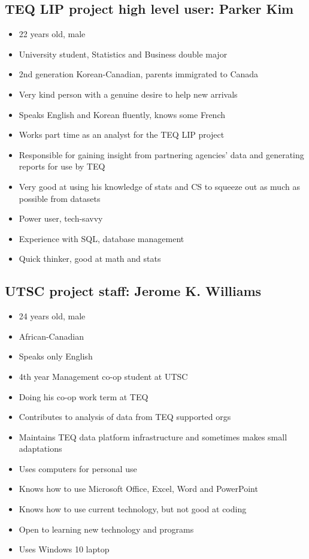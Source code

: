 \documentclass[]{scrreprt}
\begin{document}
\subsection{TEQ LIP project high level user: Parker Kim}
\begin{itemize}
	\item 22 years old, male
	\item University student, Statistics and Business double major
	\item 2nd generation Korean-Canadian, parents immigrated to Canada
	\item Very kind person with a genuine desire to help new arrivals
	\item Speaks English and Korean fluently, knows some French
	\item Works part time as an analyst for the TEQ LIP project
	\item Responsible for gaining insight from partnering agencies' data and generating reports for use by TEQ
	\item Very good at using his knowledge of stats and CS to squeeze out as much as possible from datasets
	\item Power user, tech-savvy 
	\item Experience with SQL, database management
	\item Quick thinker, good at math and stats
\end{itemize}

\subsection{UTSC project staff: Jerome K. Williams}
\begin{itemize}
	\item 24 years old, male
	\item African-Canadian
	\item Speaks only English
	\item 4th year Management co-op student at UTSC
	\item Doing his co-op work term at TEQ
	\item Contributes to analysis of data from TEQ supported orgs
	\item Maintains TEQ data platform infrastructure and sometimes makes small adaptations
	\item Uses computers for personal use
	\item Knows how to use Microsoft Office, Excel, Word and PowerPoint
	\item Knows how to use current technology, but not good at coding
	\item Open to learning new technology and programs
	\item Uses Windows 10 laptop
\end{itemize}
\end{document}
